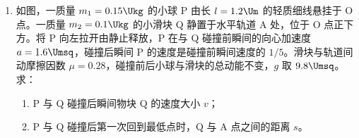 \documentclass[\gkver]{gaokaozhenti}
\begin{document}
\begin{enumerate}
{由牛顿第二定律可得

$F - mg\sin 30^{\circ} - \mu mg\cos 30^{\circ} = ma$

$F = mg\sin 30^{\circ} + \mu mg\cos 30^{\circ} + ma$

$= 0.1\times 9.8\times 0.5 + \frac{\sqrt{3}}{3}\times 0.1\times 9.8\times\frac{\sqrt{3}}{2} + 0.1\times 5$

$= 1.48 \UN$

（2）$0.4 \Us$ 后匀速，有

$F - mg\sin 30^{\circ} - \mu mg\cos 30^{\circ} - F_{\text{安}} = 0$

$F - mg\sin 30^{\circ} - \mu mg\cos 30^{\circ} - BIL = 0$

$F - mg\sin 30^{\circ} - \mu mg\cos 30^{\circ} - \frac{B^{2}L^{2}v}{R} = 0$

$\frac{B^{2}L^{2}v}{R} = 0.5$，解得 $L = 0.5 \Um$

（3）线框只有在穿过磁场区域的过程中才会产生热量，其电流强度

$I = \frac{BLv}{R} = \frac{0.5 \times 0.5 \times 2}{0.25} \UA = 2 \UA$

用时

$t = \frac{2D}{v} = \frac{2 \times 0.4}{2} \Us = 0.4 \Us$

产生的焦耳热

$Q = I^{2}Rt = 2^{2}\times 0.25\times 0.4 \UJ = 0.4 \UJ$

（使用 $Q = W_{\text{安克}}$ 亦可）

撤去外力后线框做匀减速直线运动，当速度降为零时，由于

$mg\sin 30^{\circ} = \mu mg\cos 30^{\circ}$

所以不会下滑。
}

\item
如图，一质量 $m_{1} = 0.15 \Ukg$ 的小球 P 由长 $l = 1.2 \Um$ 的轻质细线悬挂于 O 点。一质量 $m_{2} = 0.1 \Ukg$ 的小滑块 Q 静置于水平轨道 A 处，位于 O 点正下方。将 P 向左拉开由静止释放，P 在与 Q 碰撞前瞬间的向心加速度 $a = 1.6 \Umsq$，碰撞后瞬间 P 的速度是碰撞前瞬间速度的 $1/5$。滑块与轨道间动摩擦因数 $\mu = 0.28$，碰撞前后小球与滑块的总动能不变，$g$ 取 $9.8 \Umsq$。求：
\begin{enumerate}
	\item
	P 与 Q 碰撞后瞬间物块 Q 的速度大小 $v$；
	\item
	P 与 Q 碰撞后第一次回到最低点时，Q 与 A 点之间的距离 $s$。
\end{enumerate}
\onepicture[w=5cm, align=right]{}
\end{enumerate}
\end{document}
